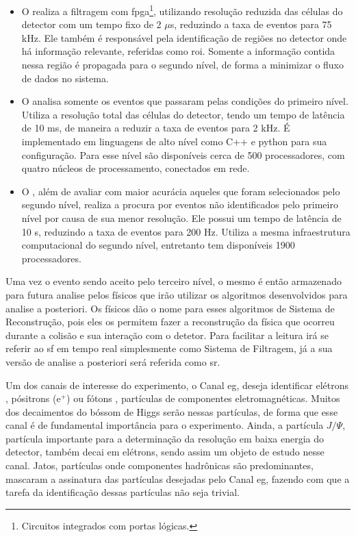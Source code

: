 \begin{itemize}
\item O  realiza a filtragem com
\gls{fpga}\footnote{Circuitos integrados com portas lógicas.}, 
utilizando resolução reduzida das células do detector
com um tempo fixo de 2 $\mu$s, reduzindo a taxa de eventos para
75 kHz. Ele também é responsável pela identificação de regiões no detector onde
há informação relevante, referidas como \gls{roi}. Somente a
informação contida nessa região é propagada para o segundo nível, de forma a
minimizar o fluxo de dados no sistema.
\item O  analisa somente os eventos que passaram pelas condições do
primeiro nível. Utiliza a resolução total das células do detector, 
tendo um tempo de latência de 10 ms, de maneira a reduzir a taxa de eventos para
2 kHz. É implementado em linguagens de alto nível como C++ e python para sua configuração. 
Para esse nível são disponíveis cerca de 500 processadores, com quatro
núcleos de processamento, conectados em rede.
\item O , além de avaliar com maior acurácia aqueles que foram
selecionados pelo segundo nível, realiza a procura por eventos não identificados pelo
primeiro nível por causa de sua menor resolução. Ele possui um tempo de 
latência de 10 s, reduzindo a taxa de eventos para 200 Hz. Utiliza a mesma
infraestrutura computacional do segundo nível, entretanto tem disponíveis 1900
processadores.
\end{itemize}

Uma vez o evento sendo aceito pelo terceiro nível, o mesmo é então armazenado
para futura analise pelos físicos que irão utilizar os algoritmos desenvolvidos 
para analise a posteriori. Os físicos dão o nome para esses algoritmos de Sistema de
Reconstrução, pois eles os permitem fazer a reconstrução da física que ocorreu
durante a colisão e sua interação com o detetor. Para facilitar a leitura irá se 
referir ao \glsdesc{sf} em tempo real simplesmente como Sistema de 
Filtragem, já a sua versão de analise a posteriori será referida como \glsdesc{sr}.

Um dos canais de interesse do experimento, o Canal \acrshort{eg},
deseja identificar elétrons , pósitrons (e$^+$)
ou fótons , 
partículas de componentes eletromagnéticas. Muitos dos decaimentos do bóssom de
Higgs serão nessas partículas, de forma que esse canal é de fundamental
importância para o experimento. Ainda, a partícula $J/\Psi$, partícula importante
para a determinação da resolução em baixa energia do detector, 
também decai em elétrons, sendo assim um objeto de estudo nesse canal.
Jatos, partículas onde componentes hadrônicas são predominantes, 
mascaram a assinatura das partículas desejadas pelo Canal \acrshort{eg}, fazendo 
com que a tarefa da identificação dessas partículas não seja trivial.

